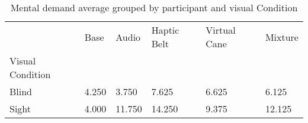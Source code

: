 
\begin{table}[!htb]
\centering
\caption{Mental demand average grouped by participant and visual Condition}
\label{tab:md_average_group}
\begin{tabular}{llllll}
\toprule
{} &  Base &  Audio &  Haptic Belt &  Virtual Cane &  Mixture \\
Visual Condition &       &        &              &               &          \\
\midrule
Blind            & 4.250 &  3.750 &        7.625 &         6.625 &    6.125 \\
Sight            & 4.000 & 11.750 &       14.250 &         9.375 &   12.125 \\
\bottomrule
\end{tabular}
\end{table}

